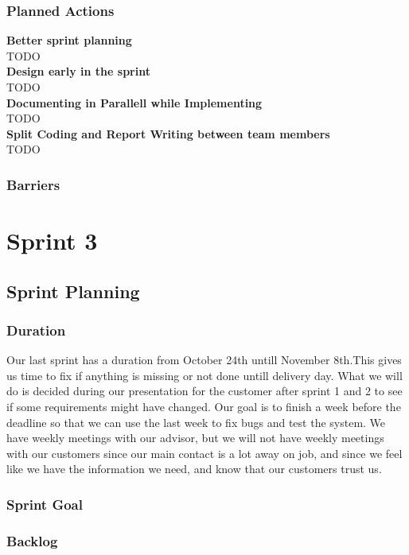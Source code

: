 \documentclass{report}
\begin{document}
\subsection{Planned Actions} \label{subsec:planned_act}
\textbf{Better sprint planning}\\
TODO\\
\textbf{Design early in the sprint}\\
TODO\\
\textbf{Documenting in Parallell while Implementing}\\
TODO\\
\textbf{Split Coding and Report Writing between team members}\\
TODO
\subsection{Barriers} \label{subsec:barriers}

\chapter{Sprint 3} \label{cha:sprint_3}
\section{Sprint Planning} \label{sec:sprint_planning}
\subsection{Duration} \label{subsec:duration}
Our last sprint has a duration from October 24th untill November 8th.This gives us time to fix if anything is missing or not done untill delivery day. What we will do is decided during our presentation for the customer after sprint 1 and 2 to see if some requirements might have changed. Our goal is to finish a week before the deadline so that we can use the last week to fix bugs and test the system. We have weekly meetings with our advisor, but we will not have weekly meetings with our customers since our main contact is a lot away on job, and since we feel like we have the information we need, and know that our customers trust us.
\subsection{Sprint Goal} \label{subsec:sprint_goal}
\subsection{Backlog} \label{subsec:backlog} %
\end{document}
